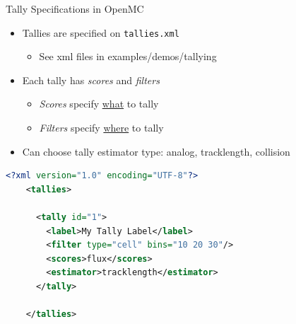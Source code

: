 \documentclass[serif]{beamer}
\begin{document}
\begin{frame}[fragile]{Tally Specifications in OpenMC}

  \begin{itemize}
    \item Tallies are specified on \verb|tallies.xml|
    \begin{itemize}
      \item See xml files in examples/demos/tallying
    \end{itemize}
    \item Each tally has \textit{scores} and \textit{filters}
    \begin{itemize}
      \item \textit{Scores} specify \underline{what} to tally
      \item \textit{Filters} specify \underline{where} to tally
    \end{itemize}
    \item Can choose tally estimator type: analog, tracklength, collision
  \end{itemize}

  \begin{scriptsize}
    \begin{lstlisting}[language=XML,gobble=4]
    <?xml version="1.0" encoding="UTF-8"?>
    <tallies>

      <tally id="1">
        <label>My Tally Label</label>
        <filter type="cell" bins="10 20 30"/>
        <scores>flux</scores>
        <estimator>tracklength</estimator>
      </tally>
      
    </tallies>
    \end{lstlisting}
  \end{scriptsize}

\end{frame}

\end{document}
